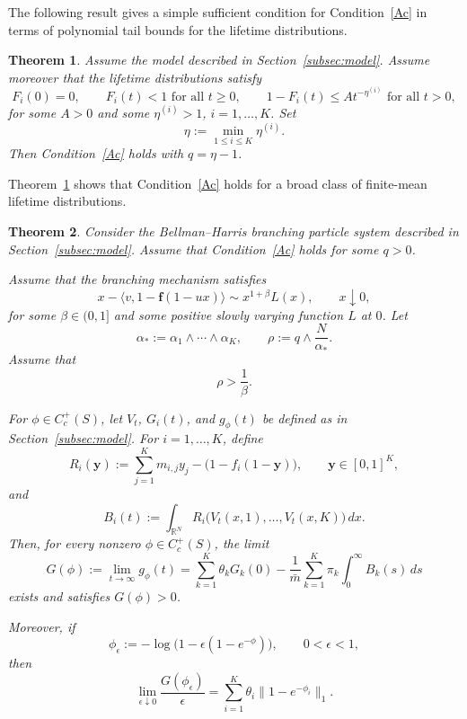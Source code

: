 \documentclass[reqno,final,11pt]{amsart}
\newcommand{\1}{\mathbbm{1}}
\theoremstyle{plain}
\newtheorem{theorem}{Theorem}[section]
\theoremstyle{definition}
\theoremstyle{remark}
\begin{document}
The following result gives a simple sufficient condition for Condition~\ref{Ac} in terms of polynomial
tail bounds for the lifetime distributions.

\begin{theorem}\label{Teo2.3}
Assume the model described in Section~\ref{subsec:model}. Assume moreover that the
    lifetime distributions satisfy
\begin{equation}\label{tail2}
F_i(0)=0,\qquad
F_i(t)<1 \text{ for all } t\ge0,\qquad
1-F_i(t)\le A t^{-\eta^{(i)}} \text{ for all } t>0,
\end{equation}
for some \(A>0\) and some \(\eta^{(i)}>1\), \(i=1,\dots,K\). Set
\[
\eta:=\min_{1\le i\le K}\eta^{(i)}.
\]
Then Condition~\ref{Ac} holds with \(q=\eta-1\).
\end{theorem}

Theorem~\ref{Teo2.3} shows that Condition~\ref{Ac} holds for a broad class of finite-mean lifetime
distributions. 

\begin{theorem}\label{Teorema2.6.8}
Consider the Bellman--Harris branching particle system described in
Section~\ref{subsec:model}. Assume that Condition~\ref{Ac} holds for some
\(q>0\).

Assume that the branching mechanism satisfies
\begin{equation}\label{eq:K-kevei-cond}
x-\langle v,1-\mathbf f(1-u x)\rangle
\sim
x^{1+\beta}L(x),
\qquad x\downarrow0,
\end{equation}
for some \(\beta\in(0,1]\) and some positive slowly varying function \(L\) at \(0\). Let
\[
\alpha_*:=\alpha_1\wedge\cdots\wedge\alpha_K,
\qquad
\rho:=q\wedge\frac{N}{\alpha_*}.
\]
Assume that
\[
\rho>\frac1\beta.
\]

For \(\phi\in C_c^+(S)\), let \(V_t\), \(G_i(t)\), and \(g_\phi(t)\) be defined as in
Section~\ref{subsec:model}. For \(i=1,\dots,K\), define
\[
R_i(\mathbf y):=
\sum_{j=1}^K m_{i,j}y_j
-
\bigl(1-f_i(1-\mathbf y)\bigr),
\qquad \mathbf y\in[0,1]^K,
\]
and
\[
B_i(t):=
\int_{\mathbb R^N}
R_i\bigl(V_t(x,1),\dots,V_t(x,K)\bigr)\,dx.
\]
Then, for every nonzero \(\phi\in C_c^+(S)\), the limit
\begin{equation}\label{gfinal}
G(\phi):=\lim_{t\to\infty}g_\phi(t)
=
\sum_{k=1}^K\theta_kG_k(0)
-
\frac1{\bar m}
\sum_{k=1}^K\pi_k\int_0^\infty B_k(s)\,ds
\end{equation}
exists and satisfies \(G(\phi)>0\).

Moreover, if
\[
\phi_\epsilon:=-\log\bigl(1-\epsilon(1-e^{-\phi})\bigr),
\qquad 0<\epsilon<1,
\]
then
\begin{equation}\label{eq:K-first-order-limit}
\lim_{\epsilon\downarrow0}
\frac{G(\phi_\epsilon)}{\epsilon}
=
\sum_{i=1}^K\theta_i\|1-e^{-\phi_i}\|_1.
\end{equation}
\end{theorem}
\end{document}
